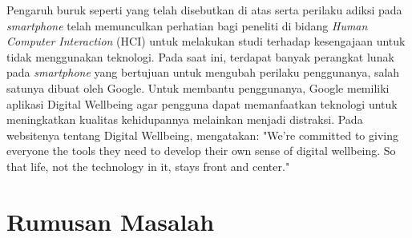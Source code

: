 Pengaruh buruk seperti yang telah disebutkan di atas serta perilaku adiksi pada \textit{smartphone} telah memunculkan perhatian bagi peneliti di bidang \textit{Human Computer Interaction} (HCI) untuk melakukan studi terhadap kesengajaan untuk tidak menggunakan teknologi. Pada saat ini, terdapat banyak perangkat lunak pada \textit{smartphone} yang bertujuan untuk mengubah perilaku penggunanya, salah satunya dibuat oleh Google. \parencite{Roffarello2019} Untuk membantu penggunanya, Google memiliki aplikasi Digital Wellbeing agar pengguna dapat memanfaatkan teknologi untuk meningkatkan kualitas kehidupannya melainkan menjadi distraksi. Pada websitenya tentang Digital Wellbeing, \textcite{google2019digitalwellbeing} mengatakan: "We’re committed to giving everyone the tools they need to develop their own sense of digital wellbeing. So that life, not the technology in it, stays front and center." 



\section{Rumusan Masalah}

